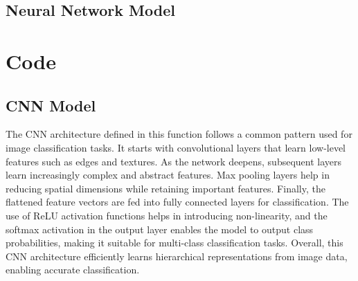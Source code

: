 \documentclass{article}
\begin{document}
\subsection{Neural Network Model}

\newpage

\section{Code}
\subsection{CNN Model}
The CNN architecture defined in this function follows a common pattern used for image classification tasks.
It starts with convolutional layers that learn low-level features such as edges and textures.
As the network deepens, subsequent layers learn increasingly complex and abstract features.
Max pooling layers help in reducing spatial dimensions while retaining important features.
Finally, the flattened feature vectors are fed into fully connected layers for classification.
The use of ReLU activation functions helps in introducing non-linearity,
and the softmax activation in the output layer enables the model to output class probabilities,
making it suitable for multi-class classification tasks.
Overall, this CNN architecture efficiently learns hierarchical representations from image data,
enabling accurate classification.
\end{document}
